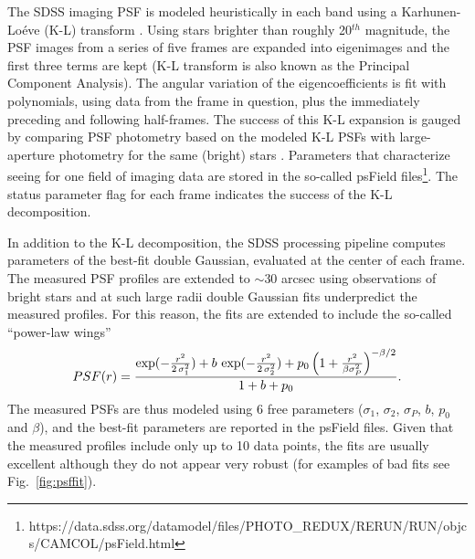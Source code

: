 The SDSS imaging PSF is modeled 
heuristically in each band using a Karhunen-Lo\'{e}ve (K-L) transform \citep{Lupton2002}. 
Using stars brighter than roughly 20$^{th}$ magnitude, the PSF images from a series of five 
frames are expanded into eigenimages and the first three terms are kept (K-L transform is 
also known as the Principal Component Analysis). The angular variation of the eigencoefficients
is fit with polynomials, using data from the frame in question, plus the immediately preceding 
and following half-frames. The success of this K-L expansion is gauged by comparing PSF 
photometry based on the modeled K-L PSFs with large-aperture photometry for the same 
(bright) stars \citep{SDSSEDR}. 
Parameters that characterize seeing for one field of imaging data are stored in the so-called psField 
files\footnote{https://data.sdss.org/datamodel/files/PHOTO\_REDUX/RERUN/RUN/objcs/CAMCOL/psField.html}. 
The status parameter flag for each frame indicates the success of the K-L decomposition.

In addition to the K-L decomposition, the SDSS processing pipeline computes parameters of the 
best-fit double Gaussian, evaluated at the center of each frame. The measured PSF profiles are 
extended to $\sim$30 arcsec using observations of bright stars and at such large radii 
double Gaussian fits underpredict the measured profiles. For this reason, the fits are extended 
to include the so-called ``power-law wings''
\begin{equation}
\label{eq:SDSSPSF}
        PSF(r) = {\exp(-{r^2\over 2\,\sigma_1^2}) + b\,\exp(-{r^2\over 2\,\sigma_2^2})
           + p_0\left(1 + { r^2 \over \beta \sigma_P^2}\right)^{-\beta/2} \over 1 + b + p_0}.
\end{equation} 
The measured PSFs are thus modeled using 6 free parameters ($\sigma_1$, $\sigma_2$, $\sigma_P$,
$b$, $p_0$ and $\beta$), and the best-fit parameters are reported in the psField files. 
Given that the measured profiles include only up to 10 data points, the fits are usually excellent
although they do not appear very robust (for examples of bad fits see Fig.~\ref{fig:psffit}). 

